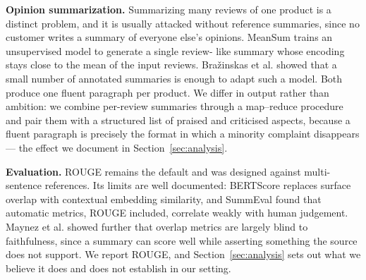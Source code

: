 \textbf{Opinion summarization.} Summarizing many reviews of one product is a
distinct problem, and it is usually attacked without reference summaries, since
no customer writes a summary of everyone else's opinions. MeanSum
\cite{chu2019meansum} trains an unsupervised model to generate a single review-
like summary whose encoding stays close to the mean of the input reviews.
Bra\v{z}inskas et al. \cite{brazinskas2020fewshot} showed that a small number of
annotated summaries is enough to adapt such a model. Both produce one fluent
paragraph per product. We differ in output rather than ambition: we combine
per-review summaries through a map--reduce procedure and pair them with a
structured list of praised and criticised aspects, because a fluent paragraph
is precisely the format in which a minority complaint disappears --- the effect
we document in Section~\ref{sec:analysis}.

\textbf{Evaluation.} ROUGE \cite{lin2004rouge} remains the default and was
designed against multi-sentence references. Its limits are well documented:
BERTScore \cite{zhang2020bertscore} replaces surface overlap with contextual
embedding similarity, and SummEval \cite{fabbri2021summeval} found that
automatic metrics, ROUGE included, correlate weakly with human judgement.
Maynez et al. \cite{maynez2020faithfulness} showed further that overlap metrics
are largely blind to faithfulness, since a summary can score well while
asserting something the source does not support. We report ROUGE, and
Section~\ref{sec:analysis} sets out what we believe it does and does not
establish in our setting.
